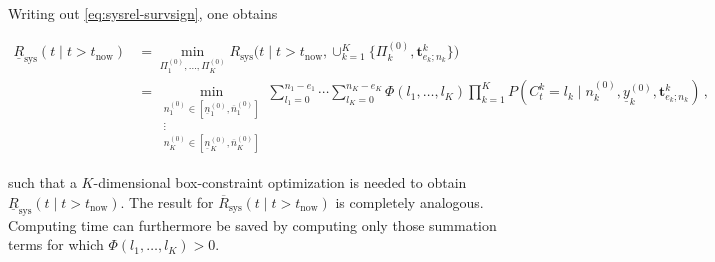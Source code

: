 \documentclass[Journal,letterpaper]{ascelike-new}
\newcommand{\mbf}[1]{\mathbf{#1}}
\renewcommand{\vec}[1]{{\bm#1}}
\newcommand{\uz}{^{(0)}} %
\newcommand{\un}{^{(n)}} %
\newcommand{\ul}[1]{\underline{#1}}
\newcommand{\ol}[1]{\overline{#1}}
\newcommand{\Rsys}{R_\text{sys}}
\newcommand{\lRsys}{\ul{R}_\text{sys}}
\newcommand{\uRsys}{\ol{R}_\text{sys}}
\def\Rsys{R_\text{sys}}
\def\Tsys{T_\text{sys}}
\def\ykz{y\uz_k}
\def\ykn{y\un_k}
\def\ykzl{\ul{y}\uz_k}
\def\nkz{n\uz_k}
\def\nkn{n\un_k}
\newcommand{\nkzfun}[1]{n\uz_{#1}}
\newcommand{\nkzlfun}[1]{\ul{n}\uz_{#1}}
\newcommand{\nkzufun}[1]{\ol{n}\uz_{#1}}
\def\PkZ{\Pi\uz_k}
\newcommand{\PZi}[1]{\Pi\uz_{#1}}
\def\tnow{t_\text{now}}
\begin{document}
Writing out \eqref{eq:sysrel-survsign}, one obtains
\begin{linenomath*}
\begin{align}
\lRsys(t \mid t > \tnow)
 &= \min_{\PZi{1},\ldots,\PZi{K}} \Rsys\big(t \mid t > \tnow, \cup_{k=1}^K \{\PkZ, \vec{t}^k_{e_k;n_k}\}\big) \nonumber\\
 &= \min_{\substack{\nkzfun{1} \in \left[\nkzlfun{1}, \nkzufun{1}\right]\\ \vdots\\ \nkzfun{K} \in \left[\nkzlfun{K}, \nkzufun{K}\right]}}
    \sum_{l_1=0}^{n_1-e_1} \cdots \sum_{l_K=0}^{n_K-e_K} \Phi(l_1,\ldots,l_K) \prod_{k=1}^K P(C^k_t = l_k\mid\nkz,\ykzl, \mbf{t}^k_{e_k;n_k})\,,
\label{eq:sysrel-optim-n0}
\end{align}
\end{linenomath*}
such that a $K$-dimensional box-constraint optimization is needed to obtain $\lRsys(t \mid t > \tnow)$.
The result for $\uRsys(t \mid t > \tnow)$ is completely analogous.
Computing time can furthermore be saved
by computing only those %
summation terms for which $\Phi(l_1,\ldots,l_K) > 0$.

\iffalse %
\begin{linenomath*}
\begin{align}
\lefteqn{P(\Tsys > t\mid\{\nkz,\ykz, \mbf{t}^k_{e_k;n_k}\}_{k=1}^K)} \\
 &= \sum_{l_1=0}^{n_1-e_1} \cdots \sum_{l_K=0}^{n_K-e_K} \Phi(l_1,\ldots,l_K) \prod_{k=1}^K
    P(C^k_t = l_k\mid\nkz,\ykz, \mbf{t}^k_{e_k;n_k}) \\
 &= \sum_{l_1=0}^{n_1-e_1} \cdots \sum_{l_K=0}^{n_K-e_K} \Phi(l_1,\ldots,l_K) \prod_{k=1}^K
    \sum_{j=0}^{n_k-e_k-l_k} (-1)^j \frac{(n_k - e_k)!}{l_k! j! (n_k - e_k - l_k - j)!} \times \\ & \hspace*{45ex}
    \left(\frac{\nkn\ykn}{\nkn\ykn + (l_k + j) (t^\kappa - (\tnow)^\kappa)}\right)^{\nkn + 1} \\
 &= \sum_{l_1=0}^{n_1-e_1} \cdots \sum_{l_K=0}^{n_K-e_K} \Phi(l_1,\ldots,l_K) \prod_{k=1}^K \label{eq:30}
    \sum_{j=0}^{n_k-e_k-l_k} (-1)^j \frac{(n_k - e_k)!}{l_k! j! (n_k - e_k - l_k - j)!} \times \\ & \hspace*{17ex}
    \left(\frac{\nkz\ykz + \sum_{i=1}^{e_k} (t_i^k)^\kappa + (n_k-e_k) (\tnow)^\kappa }%
               {\nkz\ykz + \sum_{i=1}^{e_k} (t_i^k)^\kappa + (n_k-e_k-l_k-j) (\tnow)^\kappa + (l_k + j) t^\kappa }\right)^{%
    \nkz + e_k + 1} 
\end{align}
\end{linenomath*}
\fi %
\end{document}

